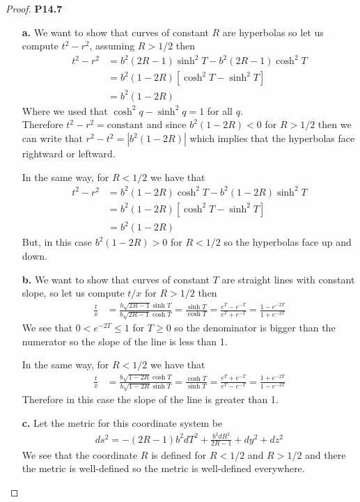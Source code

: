 \documentclass[11pt]{article}
\theoremstyle{definition}
\begin{document}
\cleardoublepage
\begin{proof}{\textbf{P14.7}}
\begin{itemize}
\item [\textbf{a.}]
We want to show that curves of constant $R$ are hyperbolas so let us compute
$t^2 - r^2$, assuming $R > 1/2$ then
\begin{align*}
    t^2 - r^2 &= b^2(2R - 1)\sinh^2 T - b^2(2R - 1)\cosh^2 T\\
    &= b^2(1 - 2R)[\cosh^2 T - \sinh^2 T]\\
    &= b^2(1 - 2R)
\end{align*}
Where we used that $\cosh^2 q - \sinh^2 q = 1$ for all $q$.
\\
Therefore $t^2 - r^2 = \text{constant}$ and since $b^2(1 - 2R) < 0$ for
$R > 1/2$ then we can write that $r^2 - t^2 = |b^2(1 - 2R)|$ which implies
that the hyperbolas face rightward or leftward.

In the same way, for $R < 1/2$ we have that
\begin{align*}
    t^2 - r^2 &= b^2(1 - 2R)\cosh^2 T - b^2(1 - 2R)\sinh^2 T\\
    &= b^2(1 - 2R)[\cosh^2 T - \sinh^2 T]\\
    &= b^2(1 - 2R)
\end{align*}
But, in this case $b^2(1 - 2R) > 0$ for $R < 1/2$ so the hyperbolas face up and
down.

\item [\textbf{b.}]
We want to show that curves of constant $T$ are straight lines with constant
slope, so let us compute $t/x$ for $R > 1/2$ then
\begin{align*}
    \frac{t}{x} &= \frac{b\sqrt{2R - 1}\sinh T}{b\sqrt{2R - 1}\cosh T}
    = \frac{\sinh T}{\cosh T}
    = \frac{e^T - e^{-T}}{e^T + e^{-T}}
    = \frac{1 - e^{-2T}}{1 + e^{-2T}}
\end{align*}
We see that $0 < e^{-2T} \leq 1$ for $T \geq 0$ so the denominator is bigger
than the numerator so the slope of the line is less than 1.

In the same way, for $R < 1/2$ we have that
\begin{align*}
    \frac{t}{x} &= \frac{b\sqrt{1 - 2R}\cosh T}{b\sqrt{1 - 2R}\sinh T}
    = \frac{\cosh T}{\sinh T}
    = \frac{e^T + e^{-T}}{e^T - e^{-T}}
    = \frac{1 + e^{-2T}}{1 - e^{-2T}}
\end{align*}
Therefore in this case the slope of the line is greater than 1.

\item [\textbf{c.}]
Let the metric for this coordinate system be
\begin{align*}
    ds^2 = -(2R - 1)b^2 dT^2 + \frac{b^2 dR^2}{2R - 1} + dy^2 + dz^2
\end{align*}
We see that the coordinate $R$ is defined for $R < 1/2$ and $R > 1/2$
and there the metric is well-defined so the metric is well-defined everywhere.


\end{itemize}
\end{proof}
\end{document}
